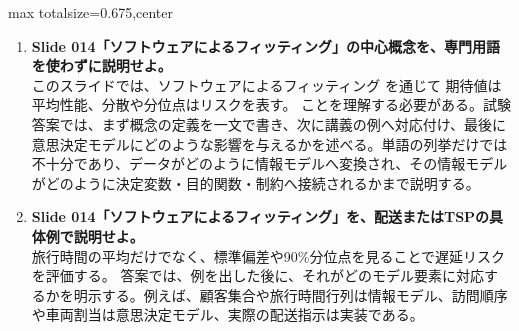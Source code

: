 \begin{adjustbox}{max totalsize={\textwidth}{0.675\textheight},center}
\begin{minipage}{\textwidth}
\begin{minipage}[t]{0.485\textwidth}
\begin{enumerate}
\item \textbf{Slide 014「ソフトウェアによるフィッティング」の中心概念を、専門用語を使わずに説明せよ。}\\このスライドでは、ソフトウェアによるフィッティング を通じて 期待値は平均性能、分散や分位点はリスクを表す。 ことを理解する必要がある。試験答案では、まず概念の定義を一文で書き、次に講義の例へ対応付け、最後に意思決定モデルにどのような影響を与えるかを述べる。単語の列挙だけでは不十分であり、データがどのように情報モデルへ変換され、その情報モデルがどのように決定変数・目的関数・制約へ接続されるかまで説明する。
\item \textbf{Slide 014「ソフトウェアによるフィッティング」を、配送またはTSPの具体例で説明せよ。}\\旅行時間の平均だけでなく、標準偏差や90\%分位点を見ることで遅延リスクを評価する。 答案では、例を出した後に、それがどのモデル要素に対応するかを明示する。例えば、顧客集合や旅行時間行列は情報モデル、訪問順序や車両割当は意思決定モデル、実際の配送指示は実装である。
\end{enumerate}
\end{minipage}
\end{minipage}
\end{adjustbox}

